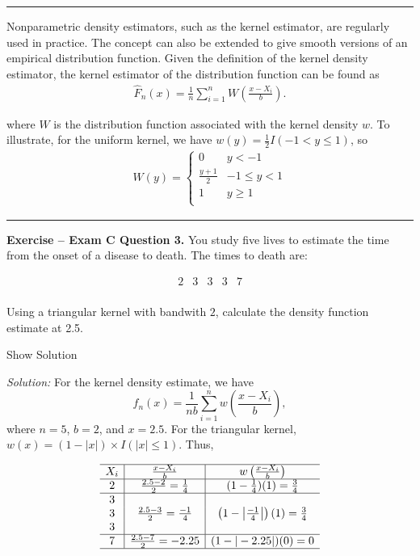 \documentclass[]{book}
\theoremstyle{definition}
\theoremstyle{definition}
\theoremstyle{definition}
\theoremstyle{remark}
\begin{document}
\begin{center}\rule{0.5\linewidth}{\linethickness}\end{center}

Nonparametric density estimators, such as the kernel estimator, are
regularly used in practice. The concept can also be extended to give
smooth versions of an empirical distribution function. Given the
definition of the kernel density estimator, the kernel estimator of the
distribution function can be found as \[\begin{aligned}
\hat{F}_n(x) = \frac{1}{n} \sum_{i=1}^n W\left(\frac{x-X_i}{b}\right).\end{aligned}\]

where \(W\) is the distribution function associated with the kernel
density \(w\). To illustrate, for the uniform kernel, we have
\(w(y) = \frac{1}{2}I(-1 < y \le 1)\), so \[\begin{aligned}
W(y) =
\begin{cases}
0 &            y<-1\\
\frac{y+1}{2}& -1 \le y < 1 \\
1 & y \ge 1 \\
\end{cases}\end{aligned}\]

\begin{center}\rule{0.5\linewidth}{\linethickness}\end{center}

\textbf{Exercise -- Exam C Question 3.} You study five lives to estimate
the time from the onset of a disease to death. The times to death are:

\[\begin{array}{ccccc}
2 & 3 & 3 & 3 & 7  \\
\end{array}\]

Using a triangular kernel with bandwith \(2\), calculate the density
function estimate at 2.5.

Show Solution

\hypertarget{toggleExamC3}{}
\emph{Solution:} For the kernel density estimate, we have
\[f_n(x) = \frac{1}{nb} \sum_{i=1}^n w\left(\frac{x-X_i}{b}\right),\]
where \(n=5\), \(b=2\), and \(x=2.5\). For the triangular kernel,
\(w(x) = (1-|x|)\times I(|x| \le 1)\). Thus,

\[\begin{array}{c|c|c}
\hline
X_i & \frac{x-X_i}{b} & w\left(\frac{x-X_i}{b} \right) \\
\hline 
2 & \frac{2.5-2}{2}=\frac{1}{4} &  (1-\frac{1}{4})(1) = \frac{3}{4} \\
\hline
3 & & \\
3 & \frac{2.5-3}{2}=\frac{-1}{4} & \left(1-\left| \frac{-1}{4} \right| \right)(1) = \frac{3}{4} \\
3 & & \\
\hline
7 & \frac{2.5-7}{2}=-2.25 & (1-|-2.25|)(0) = 0\\
\hline
\end{array}\]
\end{document}
